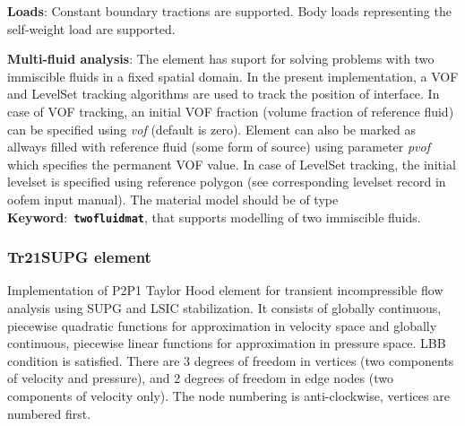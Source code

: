 \documentclass[a4paper]{article}
\newcommand{\descitem}[1]{{\noindent \bf #1}:}
\newcommand{\elemkeyword}[1]{\descitem{Keyword}~{\bf \texttt{#1}}}
\newcommand{\param}[1]{{\em #1}}
\begin{document}
\descitem{Loads} Constant boundary tractions are supported. Body loads
representing the self-weight load are supported.

\descitem{Multi-fluid analysis} The element has suport for solving
problems with two immiscible fluids in
a fixed spatial domain. In the present implementation, a VOF and LevelSet tracking algorithms
are used to track the position of interface. In case of VOF tracking, an initial VOF fraction
(volume fraction of reference fluid) can be specified using
\param{vof} (default is zero). Element can also be marked as allways
filled with reference fluid (some form of source) using parameter
\param{pvof} which specifies the permanent VOF value. In case of LevelSet tracking, the initial levelset is specified using 
reference polygon (see corresponding levelset record in oofem input manual).
The material model should be of type \elemkeyword{twofluidmat}, that
supports modelling of two immiscible fluids.

\subsubsection{Tr21SUPG element}
\label{Tr21SUPG}
Implementation of P2P1 Taylor Hood element for transient incompressible flow analysis 
using SUPG and LSIC stabilization. It consists of globally continuous, piecewise quadratic functions for 
approximation in velocity space and globally continuous, piecewise linear functions for
approximation in pressure space. LBB condition is satisfied. There are 3 degrees
of freedom in vertices (two components of velocity and pressure), and 2 degrees of freedom
in edge nodes (two components of velocity only).
The node numbering is anti-clockwise, vertices are numbered first.
\end{document}
